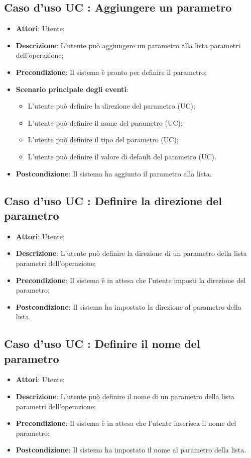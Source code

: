 \documentclass[../AnalisiDeiRequisiti.tex]{subfiles}
\begin{document}
		\subsection{Caso d'uso UC : Aggiungere un parametro}
			\begin{itemize}
				\item \textbf{Attori}: Utente;
				\item \textbf{Descrizione}: L'utente può aggiungere un parametro alla lista
				parametri dell'operazione;
				\item \textbf{Precondizione}: Il sistema è pronto per definire il parametro;
				\item \textbf{Scenario principale degli eventi}:
					\begin{itemize}
						\item L'utente può definire la direzione del parametro (UC);
						\item L'utente può definire il nome del parametro (UC);
						\item L'utente può definire il tipo del parametro (UC);
						\item L'utente può definire il valore di default del parametro (UC).
					\end{itemize}
				\item \textbf{Postcondizione}: Il sistema ha aggiunto il parametro alla lista.
			\end{itemize}
		\subsection{Caso d'uso UC : Definire la direzione del parametro}
			\begin{itemize}
				\item \textbf{Attori}: Utente;
				\item \textbf{Descrizione}: L'utente può definire la direzione di un parametro
				della lista parametri dell'operazione;
				\item \textbf{Precondizione}: Il sistema è in attesa che l'utente imposti
				la direzione del parametro;
				\item \textbf{Postcondizione}: Il sistema ha impostato la direzione al
				parametro della lista.
			\end{itemize}
		\subsection{Caso d'uso UC : Definire il nome del parametro}
			\begin{itemize}
				\item \textbf{Attori}: Utente;
				\item \textbf{Descrizione}: L'utente può definire il nome di un parametro
				della lista parametri dell'operazione;
				\item \textbf{Precondizione}: Il sistema è in attesa che l'utente inserisca
				il nome del parametro;
				\item \textbf{Postcondizione}: Il sistema ha impostato il nome al parametro
				della lista.
			\end{itemize}
\end{document}

